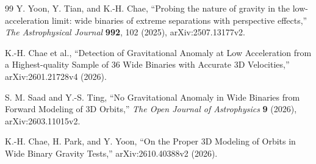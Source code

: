 \documentclass[12pt]{article}
\begin{document}
\begin{thebibliography}{99}
Y. Yoon, Y. Tian, and K.-H. Chae,
``Probing the nature of gravity in the low-acceleration limit: wide binaries of extreme separations with perspective effects,''
\emph{The Astrophysical Journal} \textbf{992}, 102 (2025),
arXiv:2507.13177v2.

K.-H. Chae et al.,
``Detection of Gravitational Anomaly at Low Acceleration from a Highest-quality Sample of 36 Wide Binaries with Accurate 3D Velocities,''
arXiv:2601.21728v4 (2026).

S. M. Saad and Y.-S. Ting,
``No Gravitational Anomaly in Wide Binaries from Forward Modeling of 3D Orbits,''
\emph{The Open Journal of Astrophysics} \textbf{9} (2026),
arXiv:2603.11015v2.

K.-H. Chae, H. Park, and Y. Yoon,
``On the Proper 3D Modeling of Orbits in Wide Binary Gravity Tests,''
arXiv:2610.40388v2 (2026).

\end{thebibliography}
\end{document}
